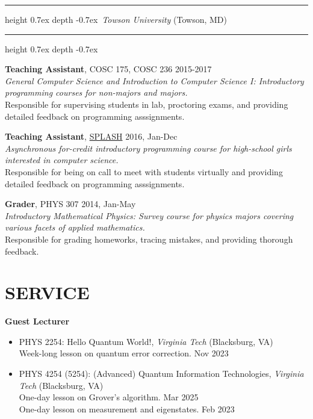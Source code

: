 \documentclass[marginmode, 10pt]{res} %
\def\Vhrulefill{\leavevmode\leaders\hrule height 0.7ex depth \dimexpr0.4pt-0.7ex\hfill\kern0pt}         %
\begin{document}
\begin{resume}
\Vhrulefill ~\textit{Towson University} (Towson, MD)~ \Vhrulefill

\textbf{Teaching Assistant}, COSC 175, COSC 236 \hfill 2015-2017 \\
\textit{General Computer Science and Introduction to Computer Science I: Introductory programming courses for non-majors and majors.} \\
Responsible for supervising students in lab, proctoring exams, and providing detailed feedback on programming asssignments.

\textbf{Teaching Assistant}, \href{https://wp.towson.edu/secured-lab/home-page/splash-about/}{SPLASH} \hfill 2016, Jan-Dec \\
\textit{Asynchronous for-credit introductory programming course for high-school girls interested in computer science.} \\
Responsible for being on call to meet with students virtually and providing detailed feedback on programming asssignments.

\textbf{Grader}, PHYS 307 \hfill 2014, Jan-May \\
\textit{Introductory Mathematical Physics: Survey course for physics majors covering various facets of applied mathematics.} \\
Responsible for grading homeworks, tracing mistakes, and providing thorough feedback.



\pagebreak

\section{\small{SERVICE}}

\textbf{Guest Lecturer}
\begin{itemize}
    \item PHYS 2254: Hello Quantum World!, \textit{Virginia Tech} (Blacksburg, VA) \\
    Week-long lesson on quantum error correction. \hfill Nov 2023
    \item PHYS 4254 (5254): (Advanced) Quantum Information Technologies, \textit{Virginia Tech} (Blacksburg, VA) \\
    One-day lesson on Grover's algorithm. \hfill Mar 2025 \\
    One-day lesson on measurement and eigenstates. \hfill Feb 2023
\end{itemize}


\end{resume}
\end{document}

